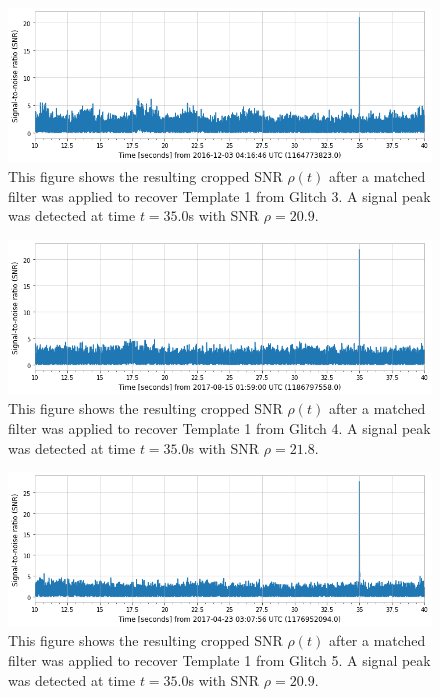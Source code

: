 \documentclass[preprint,
letterpaper,
 amsmath,amssymb,
 aps,
]{revtex4-2}
\begin{document}
\begin{figure}[t]
\caption{This figure shows the resulting cropped SNR $\rho(t)$ after a matched filter was applied to recover Template 1 from Glitch 3. A signal peak was detected at time $t = 35.0$s with SNR $\rho = 20.9$.}
\includegraphics[scale = .33]{glitch 3 template 1.png}
\centering
\end{figure}
\begin{figure}[t]
\caption{This figure shows the resulting cropped SNR $\rho(t)$ after a matched filter was applied to recover Template 1 from Glitch 4. A signal peak was detected at time $t = 35.0$s with SNR $\rho = 21.8$.}
\includegraphics[scale = .33]{glitch 4 template 1.png}
\centering
\end{figure}
\begin{figure}[t]
\caption{This figure shows the resulting cropped SNR $\rho(t)$ after a matched filter was applied to recover Template 1 from Glitch 5. A signal peak was detected at time $t = 35.0$s with SNR $\rho = 20.9$.}
\includegraphics[scale = .33]{glitch 5 template 1.png}
\centering
\end{figure}
\end{document}
